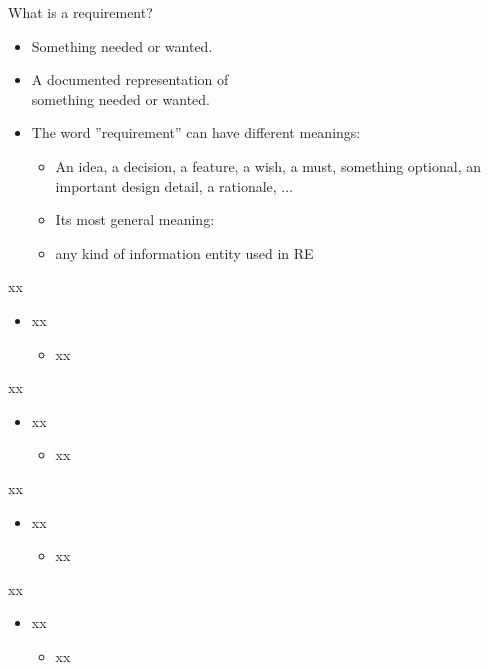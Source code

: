 \documentclass{beamer}
\begin{document}
\begin{frame}[fragile]{What is a requirement?}
\begin{itemize}
\item Something needed or wanted.
\item A documented representation of \\something needed or wanted.
\item The word ''requirement'' can have different meanings:
\begin{itemize}
\item An idea, a decision, a feature, a wish, a must, something optional, an important design detail, a rationale, ...
\item Its most general meaning:
\item[] any kind of information entity used in RE
\end{itemize}
\end{itemize}
\end{frame}

\begin{frame}[fragile]{xx}
\begin{itemize}
\item xx 
\begin{itemize}
\item xx 
\end{itemize}
\end{itemize}
\end{frame}

\begin{frame}[fragile]{xx}
\begin{itemize}
\item xx 
\begin{itemize}
\item xx 
\end{itemize}
\end{itemize}
\end{frame}

\begin{frame}[fragile]{xx}
\begin{itemize}
\item xx 
\begin{itemize}
\item xx 
\end{itemize}
\end{itemize}
\end{frame}

\begin{frame}[fragile]{xx}
\begin{itemize}
\item xx 
\begin{itemize}
\item xx 
\end{itemize}
\end{itemize}
\end{frame}
\end{document}
